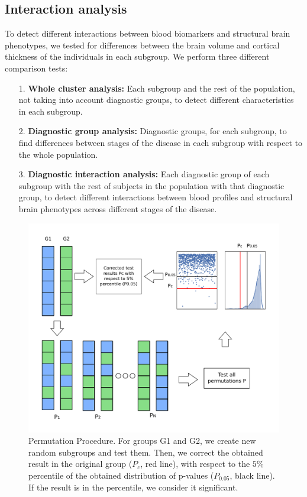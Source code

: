 \subsection{Interaction analysis}

To detect different interactions between blood biomarkers and structural brain phenotypes, we tested for differences between the brain volume and cortical thickness of the individuals in each subgroup. We perform three different comparison tests:

\begin{itemize}
\item[1.] \textbf{Whole cluster analysis:} Each subgroup and the rest of the population, not taking into account diagnostic groups, to detect different characteristics in each subgroup.
\item[2.] \textbf{ Diagnostic group analysis:} Diagnostic groups, for each subgroup, to find differences between stages of the disease in each subgroup with respect to the whole population. 
\item[3.] \textbf{Diagnostic interaction analysis:} Each diagnostic group of each subgroup with the rest of subjects in the population with that diagnostic group, to detect different interactions between blood profiles and structural brain phenotypes across different stages of the disease.
\end{itemize}

\begin{figure}[!htbp]
\centering
\includegraphics[width=1.0\textwidth]{figures/cimlr/figure_2.pdf}
    \caption[Permutation procedure.]{Permutation Procedure. For groups G1 and G2, we create new random subgroups and test them. Then, we correct the obtained result in the original group ($P_c$, red line), with respect to the $5\%$ percentile of the obtained distribution of p-values ($P_{0.05}$, black line). If the result is in the percentile, we consider it significant.}
    \label{fig:permutation}
\end{figure}

